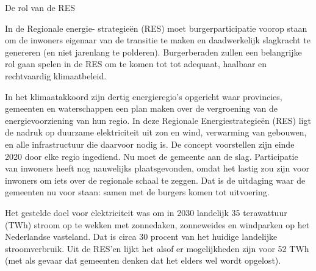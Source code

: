 \begin{voorstel}{De rol van de RES}


\begin{samenvatting}
In de Regionale energie- strategieën (RES) moet burgerparticipatie voorop staan om de inwoners eigenaar van de transitie te maken en daadwerkelijk slagkracht te genereren (en niet jarenlang te polderen). Burgerberaden zullen een belangrijke rol gaan spelen in de RES om te komen tot tot adequaat, haalbaar en rechtvaardig klimaatbeleid. 
\end{samenvatting}

\begin{uitdaging}
In het klimaatakkoord zijn dertig energieregio’s opgericht waar provincies, gemeenten en waterschappen een plan maken over de vergroening van de energievoorziening van hun regio. In deze Regionale Energiestrategieën (RES) ligt de nadruk op duurzame elektriciteit uit zon en wind, verwarming van gebouwen, en alle infrastructuur die daarvoor nodig is. De concept voorstellen zijn einde 2020 door elke regio ingediend. Nu moet de gemeente aan de slag. Participatie van inwoners heeft nog nauwelijks plaatsgevonden, omdat het lastig zou zijn voor inwoners om iets over de regionale schaal te zeggen. Dat is de uitdaging waar de gemeenten nu voor staan: samen met de burgers komen tot uitvoering.
\end{uitdaging}

\begin{overwegingen}
Het gestelde doel voor elektriciteit was om in 2030 landelijk 35 terawattuur (TWh) stroom op te wekken met zonnedaken, zonneweides en windparken op het Nederlandse vasteland. Dat is circa 30 procent van het huidige landelijke stroomverbruik. Uit de RES’en lijkt het alsof er mogelijkheden zijn voor 52 TWh (met als gevaar dat gemeenten denken dat het elders wel wordt opgelost).


\end{overwegingen}
\end{voorstel}

